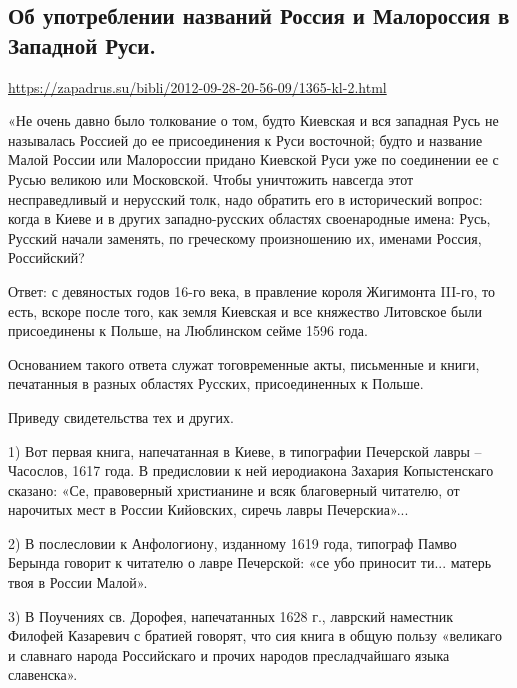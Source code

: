  
 
 
 
 

\subsection{Об употреблении названий Россия и Малороссия в Западной Руси.}

\url{https://zapadrus.su/bibli/2012-09-28-20-56-09/1365-kl-2.html}

«Не очень давно было толкование о том, будто Киевская и вся западная Русь не
называлась Россией до ее присоединения к Руси восточной; будто и название Малой
России или Малороссии придано Киевской Руси уже по соединении ее с Русью
великою или Московской. Чтобы уничтожить навсегда этот несправедливый и
нерусский толк, надо обратить его в исторический вопрос: когда в Киеве и в
других западно-русских областях своенародные имена: Русь, Русский начали
заменять, по греческому произношению их, именами Россия, Российский?

Ответ: с девяностых годов 16-го века, в правление короля Жигимонта III-го, то
есть, вскоре после того, как земля Киевская и все княжество Литовское были
присоединены к Польше, на Люблинском сейме 1596 года.

Основанием такого ответа служат тоговременные акты, письменные и книги,
печатанныя в разных областях Русских, присоединенных к Польше. 

Приведу свидетельства тех и других.

1) Вот первая книга, напечатанная в Киеве, в типографии Печерской лавры –
Часослов, 1617 года. В предисловии к ней иеродиакона Захария Копыстенскаго
сказано: «Се, правоверный христианине и всяк благоверный читателю, от нарочитых
мест в России Кийовских, сиречь лавры Печерскиа»...

2) В послесловии к Анфологиону, изданному 1619 года, типограф Памво Берында
говорит к читателю о лавре Печерской: «се убо приносит ти... матерь твоя в
России Малой».

3) В Поучениях св. Дорофея, напечатанных 1628 г., лаврский наместник Филофей
Казаревич с братией говорят, что сия книга в общую пользу «великаго и славнаго
народа Российскаго и прочих народов пресладчайшаго языка славенска».

